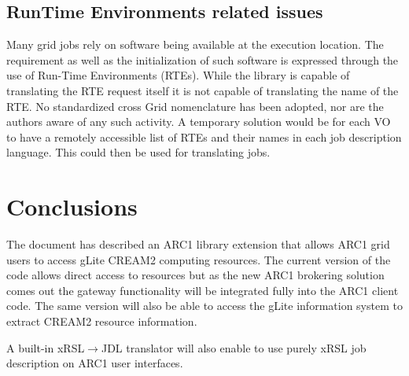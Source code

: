 \documentclass{article}
\begin{document}
\subsection{RunTime Environments related issues}
Many grid jobs rely on software being available at the execution location. The requirement as well as the initialization 
of such software is expressed through the use of Run-Time Environments (RTEs). While the library is capable of 
translating the RTE request itself it is not capable of translating the name of the RTE. No standardized cross Grid 
nomenclature has been adopted, nor are the authors aware of any such activity. A temporary solution would be for each 
VO to have a remotely accessible list of RTEs and their names in each job description language. This could then be used for translating jobs.
\section{Conclusions}
\label{Conclusions}
The document has described an ARC1 library extension that allows ARC1 grid users to access gLite CREAM2 computing resources. The current version of the code allows direct access to resources but as the new ARC1 brokering solution comes out the gateway functionality will be integrated fully into the ARC1 client code. The same version will also be able to access the gLite information system to extract CREAM2 resource information.\par
A built-in xRSL${\rightarrow}$JDL translator will also enable to use purely xRSL job description on ARC1 user interfaces.
\end{document}
